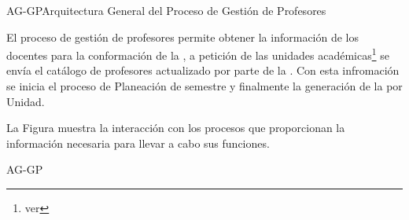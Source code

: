 


\begin{Arquitectura}{AG-GP}{Arquitectura General del Proceso de Gestión de Profesores} {
		
		El proceso de gestión de profesores permite obtener la información de los docentes para la conformación de la , a petición de las unidades académicas\footnote{ver } se envía el catálogo de profesores actualizado por parte de la . Con esta infromación se inicia el proceso de Planeación de semestre y finalmente la generación de la  por Unidad.

		
		\noindent La Figura  muestra la interacción con los procesos que proporcionan la información necesaria para llevar a cabo sus funciones.

		} {AG-GP}

\end{Arquitectura}

